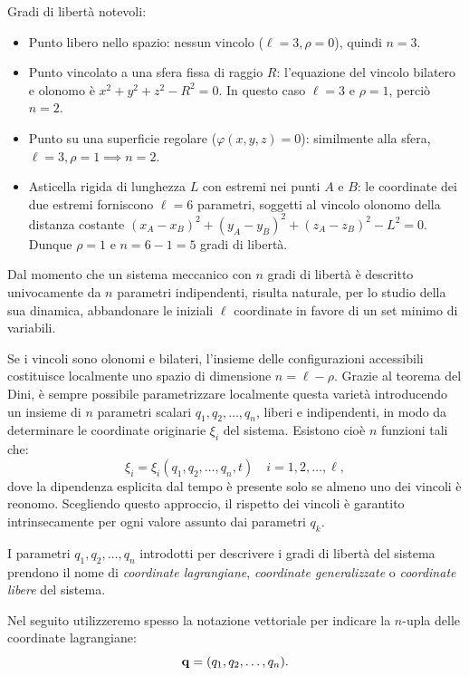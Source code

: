 \begin{example}
Gradi di libertà notevoli:
\begin{itemize}
    \item Punto libero nello spazio: nessun vincolo ($\ell=3, \rho=0$), quindi $n = 3$.
    \item Punto vincolato a una sfera fissa di raggio $R$: l'equazione del vincolo bilatero e olonomo è $x^2 + y^2 + z^2 - R^2 = 0$. In questo caso $\ell=3$ e $\rho=1$, perciò $n = 2$.
    \item Punto su una superficie regolare ($\varphi(x,y,z) = 0$): similmente alla sfera, $\ell=3, \rho=1 \implies n=2$.
    \item Asticella rigida di lunghezza $L$ con estremi nei punti $A$ e $B$: le coordinate dei due estremi forniscono $\ell=6$ parametri, soggetti al vincolo olonomo della distanza costante $(x_A - x_B)^2 + (y_A - y_B)^2 + (z_A - z_B)^2 - L^2 = 0$. Dunque $\rho=1$ e $n = 6 - 1 = 5$ gradi di libertà.
\end{itemize}
\end{example}

Dal momento che un sistema meccanico con $n$ gradi di libertà è descritto univocamente da $n$ parametri indipendenti, risulta naturale, per lo studio della sua dinamica, abbandonare le iniziali $\ell$ coordinate in favore di un set minimo di variabili.

Se i vincoli sono olonomi e bilateri, l'insieme delle configurazioni accessibili costituisce localmente uno spazio di dimensione $n = \ell - \rho$. Grazie al teorema del Dini, è sempre possibile parametrizzare localmente questa varietà introducendo un insieme di $n$ parametri scalari $q_1, q_2, \dots, q_n$, liberi e indipendenti, in modo da determinare le coordinate originarie $\xi_i$ del sistema. Esistono cioè $n$ funzioni tali che:
\begin{equation*}
    \xi_i = \xi_i(q_1, q_2, \dots, q_n, t) \quad i = 1, 2, \dots, \ell,
\end{equation*}
dove la dipendenza esplicita dal tempo è presente solo se almeno uno dei vincoli è reonomo. Scegliendo questo approccio, il rispetto dei vincoli è garantito intrinsecamente per ogni valore assunto dai parametri $q_k$.

\begin{definition}
    I parametri $q_1, q_2, \dots, q_n$ introdotti per descrivere i gradi di libertà del sistema prendono il nome di \emph{coordinate lagrangiane}, \emph{coordinate generalizzate} o \emph{coordinate libere} del sistema.

    Nel seguito utilizzeremo spesso la notazione vettoriale per indicare la $n$-upla delle coordinate lagrangiane: 
    \begin{equation*}
        \vb{q} = (q_1, q_2, \dots, q_n).
    \end{equation*}
\end{definition}

